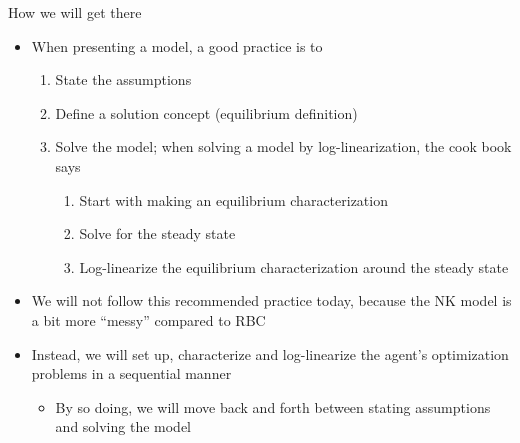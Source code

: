 \documentclass[9pt,xcolor={dvipsnames}]{beamer}
\newcommand{\bit}{\begin{itemize}}
\newcommand{\eit}{\end{itemize}}
\newcommand{\ben}{\begin{enumerate}}
\newcommand{\een}{\end{enumerate}}
\newcommand{\bc}{\color{blue}}
\begin{document}
\begin{frame}{How we will get there}

\bit
\setlength\itemsep{1.5em} 

\item When presenting a model, a good practice is to
\ben
\setlength\itemsep{0.5em}

\item State the assumptions

\item Define a solution concept (equilibrium definition)

\item Solve the model; when solving a model by log-linearization, the cook book says
\ben
\setlength\itemsep{0.5em}

\item Start with making an {\bc equilibrium characterization}

\item Solve for the {\bc steady state}

\item {\bc Log-linearize} the {\bc equilibrium characterization} around the {\bc steady state}

\een

\een

\item We will not follow this recommended practice today, because the NK model is a bit more ``messy'' compared to RBC

\item Instead, we will set up, characterize and log-linearize the agent's optimization problems in a sequential manner
\bit
	\item By so doing, we will move back and forth between stating assumptions and solving the model
\eit

\eit

\end{frame}
\end{document}
